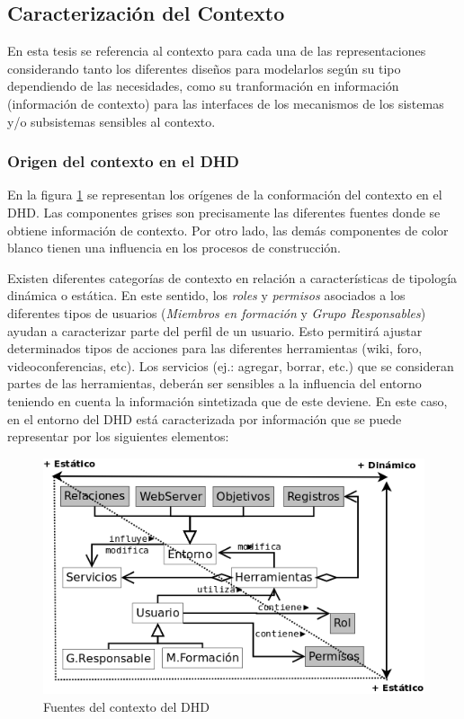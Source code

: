 \subsection {Caracterización del Contexto}

En esta tesis se referencia al contexto para cada una de las
representaciones considerando tanto los diferentes diseños para modelarlos según su
tipo dependiendo de las necesidades, como su tranformación en
información (información de contexto)  para las interfaces de
los mecanismos de los sistemas y/o subsistemas sensibles al contexto.

\subsubsection{Origen del contexto en el DHD}

En la figura \ref{fig:ontologiaContexto} se representan los orígenes de la
conformación del contexto en el DHD. Las componentes grises son
precisamente las diferentes fuentes donde se obtiene
información de contexto. Por otro lado, las demás
componentes de color blanco tienen una influencia en los procesos de
construcción. 

Existen diferentes categorías de contexto en relación a
características de tipología dinámica o estática. En este sentido, los
\textit{roles} y \textit{permisos} asociados a los diferentes tipos de usuarios
(\textit{Miembros en formación} y \textit{Grupo Responsables}) ayudan a
caracterizar parte del perfil de un usuario. Esto permitirá ajustar determinados
tipos de acciones para las diferentes herramientas (wiki, foro,
videoconferencias, etc). Los servicios (ej.: agregar, borrar, etc.) que se consideran
partes de las herramientas, deberán ser sensibles a la influencia del entorno
teniendo en cuenta la información sintetizada que de este deviene. En este caso,
en el entorno del DHD está caracterizada por información que se puede
representar por los siguientes elementos: 


\begin{figure} 
\begin{center}
 \includegraphics [width=5 in,totalheight=3 in] {Ch1/Figuras/contexto.png}
\caption {Fuentes del contexto del DHD}
\label{fig:ontologiaContexto}
\end{center}
\end{figure}



